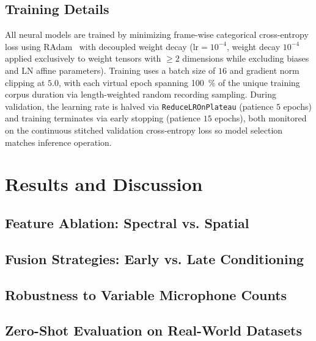 \documentclass[lettersize,journal]{IEEEtran}
\begin{document}
\subsection{Training Details}
All neural models are trained by minimizing frame-wise categorical cross-entropy loss using RAdam~\cite{liu2020radam} with decoupled weight decay ($\mathrm{lr} = 10^{-4}$, weight decay $10^{-4}$ applied exclusively to weight tensors with $\ge 2$ dimensions while excluding biases and \gls{LN} affine parameters). Training uses a batch size of $16$ and gradient norm clipping at $5.0$, with each virtual epoch spanning \SI{100}{\percent} of the unique training corpus duration via length-weighted random recording sampling. During validation, the learning rate is halved via \texttt{ReduceLROnPlateau} (patience $5$ epochs) and training terminates via early stopping (patience $15$ epochs), both monitored on the continuous stitched validation cross-entropy loss so model selection matches inference operation.


\section{Results and Discussion}

\subsection{Feature Ablation: Spectral vs. Spatial}

\subsection{Fusion Strategies: Early vs. Late Conditioning}

\subsection{Robustness to Variable Microphone Counts}

\subsection{Zero-Shot Evaluation on Real-World Datasets}
\end{document}
